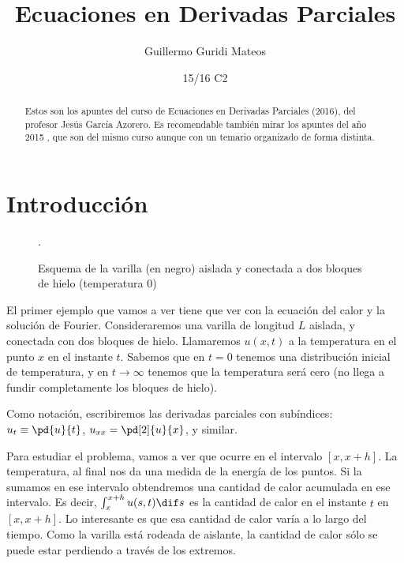 \documentclass[palatino]{apuntes}
\title{Ecuaciones en Derivadas Parciales}
\author{Guillermo Guridi Mateos}
\date{15/16 C2}
\begin{document}
\pagestyle{plain}


\begin{abstract}
Estos son los apuntes del curso de Ecuaciones en Derivadas Parciales (2016), del profesor Jesús García Azorero. Es recomendable también mirar los apuntes del año 2015 \cite{ApuntesEDPRual}, que son del mismo curso aunque con un temario organizado de forma distinta.
\end{abstract}

\maketitle

\tableofcontents
\newpage

\chapter{Introducción}

\begin{figure}[hbtp]
\centering
{}
\caption{Esquema de la varilla (en negro) aislada y conectada a dos bloques de hielo (temperatura 0)}.
\label{fig:TransmisionCalor}
\end{figure}

El primer ejemplo que vamos a ver tiene que ver con la ecuación del calor y la solución de Fourier. Consideraremos una varilla de longitud $L$ aislada, y conectada con dos bloques de hielo. Llamaremos $u(x,t)$ a la temperatura en el punto $x$ en el instante $t$. Sabemos que en $t = 0$ tenemos una distribución inicial de temperatura, y en $t \to ∞$ tenemos que la temperatura será cero (no llega a fundir completamente los bloques de hielo).

Como notación, escribiremos las derivadas parciales con subíndices: $u_t \equiv \pd{u}{t}$, $u_{xx} = \pd[2]{u}{x}$, y similar.

Para estudiar el problema, vamos a ver que ocurre en el intervalo $[x, x+h]$. La temperatura, al final nos da una medida de la energía de los puntos. Si la sumamos en ese intervalo obtendremos una cantidad de calor acumulada en ese intervalo. Es decir, $\int_x^{x+h} u(s,t) \dif s$ es la cantidad de calor en el instante $t$ en $[x,x+h]$. Lo interesante es que esa cantidad de calor varía a lo largo del tiempo. Como la varilla está rodeada de aislante, la cantidad de calor sólo se puede estar perdiendo a través de los extremos.
\end{document}
